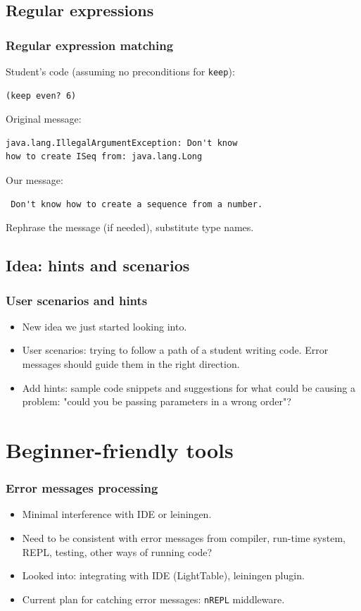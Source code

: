 \documentclass{beamer}
\begin{document}
\subsection{Regular expressions}
\begin{frame}[fragile]
 \frametitle {Regular expression matching}
Student's code (assuming no preconditions for {\tt keep}):
\begin{verbatim}
(keep even? 6)
\end{verbatim}
Original message:
\begin{verbatim}
java.lang.IllegalArgumentException: Don't know 
how to create ISeq from: java.lang.Long
\end{verbatim}
Our message:
\begin{verbatim}
 Don't know how to create a sequence from a number. 
\end{verbatim}
Rephrase the message (if needed), substitute type names. 
\end{frame}


\subsection{Idea: hints and scenarios}

\begin{frame}
   \frametitle{User scenarios and hints}
\begin{itemize}
\item New idea we just started looking into.
\item User scenarios: trying to follow a path of a student writing code. Error messages should guide them in the right direction.
\item Add hints: sample code snippets and suggestions for what could be causing a problem: "could you be passing parameters in a wrong order"? 
\end{itemize}
\end{frame}

\section{Beginner-friendly tools}

\begin{frame}
   \frametitle{Error messages processing}
\begin{itemize}
\item Minimal interference with IDE or leiningen.
\item Need to be consistent with error messages from compiler,  run-time system, REPL, testing, other ways of running code?
\item Looked into: integrating with IDE (LightTable), leiningen plugin. 
\item Current plan for catching error messages: {\tt nREPL} middleware. 
\end{itemize}
\end{frame}
\end{document}
